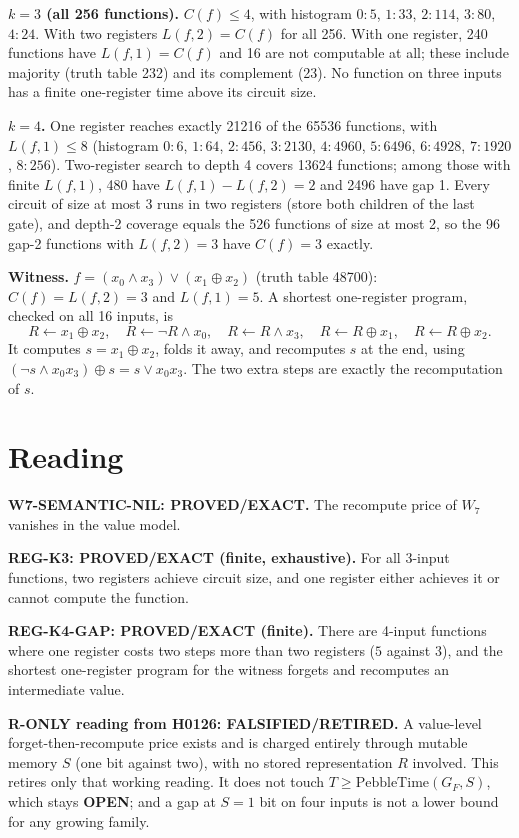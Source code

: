 \documentclass[11pt]{article}
\begin{document}
\textbf{$k=3$ (all 256 functions).} $C(f)\le4$, with histogram $0{:}5$, $1{:}33$, $2{:}114$, $3{:}80$, $4{:}24$. With two registers $L(f,2)=C(f)$ for all 256. With one register, 240 functions have $L(f,1)=C(f)$ and 16 are not computable at all; these include majority (truth table 232) and its complement (23). No function on three inputs has a finite one-register time above its circuit size.

\textbf{$k=4$.} One register reaches exactly 21216 of the 65536 functions, with $L(f,1)\le8$ (histogram $0{:}6$, $1{:}64$, $2{:}456$, $3{:}2130$, $4{:}4960$, $5{:}6496$, $6{:}4928$, $7{:}1920$, $8{:}256$). Two-register search to depth 4 covers 13624 functions; among those with finite $L(f,1)$, 480 have $L(f,1)-L(f,2)=2$ and 2496 have gap 1. Every circuit of size at most 3 runs in two registers (store both children of the last gate), and depth-2 coverage equals the 526 functions of size at most 2, so the 96 gap-2 functions with $L(f,2)=3$ have $C(f)=3$ exactly.

\textbf{Witness.} $f=(x_0\wedge x_3)\vee(x_1\oplus x_2)$ (truth table 48700): $C(f)=L(f,2)=3$ and $L(f,1)=5$. A shortest one-register program, checked on all 16 inputs, is
\[
R\gets x_1\oplus x_2,\quad R\gets\lnot R\wedge x_0,\quad R\gets R\wedge x_3,\quad R\gets R\oplus x_1,\quad R\gets R\oplus x_2 .
\]
It computes $s=x_1\oplus x_2$, folds it away, and recomputes $s$ at the end, using $(\lnot s\wedge x_0x_3)\oplus s=s\vee x_0x_3$. The two extra steps are exactly the recomputation of $s$.

\section*{Reading}
\textbf{W7-SEMANTIC-NIL: PROVED/EXACT.} The recompute price of $W_7$ vanishes in the value model.

\textbf{REG-K3: PROVED/EXACT (finite, exhaustive).} For all 3-input functions, two registers achieve circuit size, and one register either achieves it or cannot compute the function.

\textbf{REG-K4-GAP: PROVED/EXACT (finite).} There are 4-input functions where one register costs two steps more than two registers ($5$ against $3$), and the shortest one-register program for the witness forgets and recomputes an intermediate value.

\textbf{R-ONLY reading from H0126: FALSIFIED/RETIRED.} A value-level forget-then-recompute price exists and is charged entirely through mutable memory $S$ (one bit against two), with no stored representation $R$ involved. This retires only that working reading. It does not touch $T\ge\mathrm{PebbleTime}(G_F,S)$, which stays \textbf{OPEN}; and a gap at $S=1$ bit on four inputs is not a lower bound for any growing family.
\end{document}
